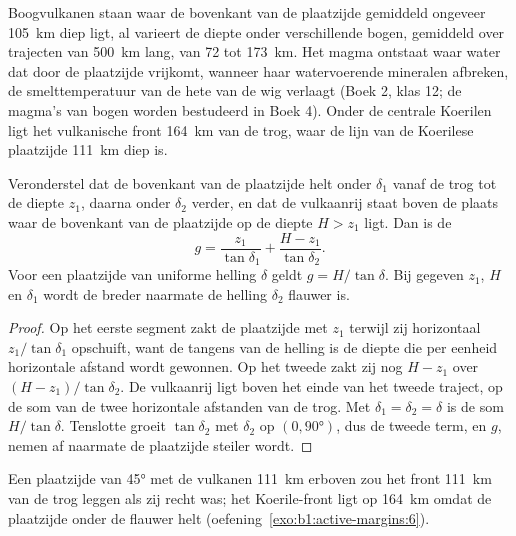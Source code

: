 Boogvulkanen staan waar de bovenkant van de plaatzijde gemiddeld ongeveer \qty{105}{km} diep ligt, al varieert de diepte onder verschillende bogen, gemiddeld over trajecten van \qty{500}{km} lang, van 72 tot \qty{173}{km}. Het magma ontstaat waar water dat door de plaatzijde vrijkomt, wanneer haar watervoerende mineralen afbreken, de smelttemperatuur van de hete  van de wig verlaagt (Boek 2, klas 12; de magma's van bogen worden bestudeerd in Boek 4). Onder de centrale Koerilen ligt het vulkanische front \qty{164}{km} van de trog, waar de lijn van de Koerilese plaatzijde \qty{111}{km} diep is.

\begin{proposition}\label{prop:b1:active-margins:gap}
Veronderstel dat de bovenkant van de plaatzijde helt onder $\delta_1$ vanaf de trog tot de diepte $z_1$, daarna onder $\delta_2$ verder, en dat de vulkaanrij staat boven de plaats waar de bovenkant van de plaatzijde op de diepte $H > z_1$ ligt. Dan is de 
\[
  g = \frac{z_1}{\tan\delta_1} + \frac{H - z_1}{\tan\delta_2} .
\]
Voor een plaatzijde van uniforme helling $\delta$ geldt $g = H/\tan\delta$. Bij gegeven $z_1$, $H$ en $\delta_1$ wordt de  breder naarmate de helling $\delta_2$ flauwer is.
\end{proposition}

\begin{proof}
Op het eerste segment zakt de plaatzijde met $z_1$ terwijl zij horizontaal $z_1/\tan\delta_1$ opschuift, want de tangens van de helling is de diepte die per eenheid horizontale afstand wordt gewonnen. Op het tweede zakt zij nog $H - z_1$ over $(H - z_1)/\tan\delta_2$. De vulkaanrij ligt boven het einde van het tweede traject, op de som van de twee horizontale afstanden van de trog. Met $\delta_1 = \delta_2
= \delta$ is de som $H/\tan\delta$. Tenslotte groeit $\tan\delta_2$ met $\delta_2$ op $(0, \ang{90})$, dus de tweede term, en $g$, nemen af naarmate de plaatzijde steiler wordt.
\end{proof}

Een plaatzijde van \ang{45} met de vulkanen \qty{111}{km} erboven zou het front \qty{111}{km} van de trog leggen als zij recht was; het Koerile-front ligt op \qty{164}{km} omdat de plaatzijde onder de  flauwer helt (oefening~\ref{exo:b1:active-margins:6}).

